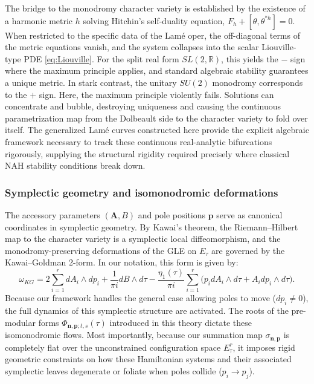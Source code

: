\documentclass[11pt]{amsart}
\theoremstyle{remark}
\numberwithin{equation}{section}
\begin{document}
The bridge to the monodromy character variety is established by the existence of a harmonic metric $h$ solving Hitchin's self-duality equation, $F_{h} + [\theta, \theta^{*h}] = 0$. When restricted to the specific data of the Lamé oper, the off-diagonal terms of the metric equations vanish, and the system collapses into the scalar Liouville-type PDE \eqref{eq:Liouville}. For the split real form $SL(2, \mathbb{R})$, this yields the $-$ sign where the maximum principle applies, and standard algebraic stability guarantees a unique metric. In stark contrast, the unitary $SU(2)$ monodromy corresponds to the $+$ sign. Here, the maximum principle violently fails. Solutions can concentrate and bubble, destroying uniqueness and causing the continuous parametrization map from the Dolbeault side to the character variety to fold over itself. The generalized Lamé curves constructed here provide the explicit algebraic framework necessary to track these continuous real-analytic bifurcations rigorously, supplying the structural rigidity required precisely where classical NAH stability conditions break down.



\subsubsection{Symplectic geometry and isomonodromic deformations} \label{ss:Kawai_Goldman}
The accessory parameters $(\mathbf{A}, B)$ and pole positions $\mathbf{p}$ serve as canonical coordinates in symplectic geometry. By Kawai's theorem, the Riemann--Hilbert map to the character variety is a symplectic local diffeomorphism, and the monodromy-preserving deformations of the GLE on $E_\tau$ are governed by the Kawai--Goldman 2-form. In our notation, this form is given by:
\begin{equation*} 
\omega_{KG} = 2 \sum_{i=1}^r dA_i \wedge dp_i + \frac{1}{\pi i} dB \wedge d\tau - \frac{\eta_1(\tau)}{\pi i} \sum_{i=1}^r \Big(p_i dA_i \wedge d\tau + A_i dp_i \wedge d\tau\Big).
\end{equation*}
Because our framework handles the general case allowing poles to move ($dp_i \neq 0$), the full dynamics of this symplectic structure are activated. The roots of the pre-modular forms $\Phi_{\mathbf{n},\mathbf{p};t,s}(\tau)$ introduced in this theory dictate these isomonodromic flows. Most importantly, because our summation map $\sigma_{\mathbf{n}, \mathbf{p}}$ is completely flat over the unconstrained configuration space $E_\tau^r$, it imposes rigid geometric constraints on how these Hamiltonian systems and their associated symplectic leaves degenerate or foliate when poles collide ($p_i \to p_j$).
\end{document}
